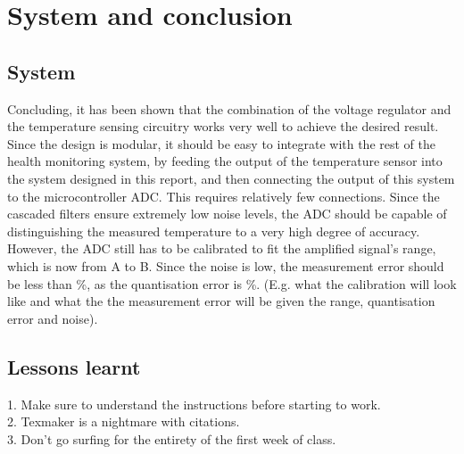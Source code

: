 \chapter{System and conclusion}
\vspace{-5mm}
\section{System}
Concluding, it has been shown that the combination of the voltage regulator and the temperature sensing circuitry works very well to achieve the desired result. Since the design is modular, it should be easy to integrate with the rest of the health monitoring system, by feeding the output of the temperature sensor into the system designed in this report, and then connecting the output of this system to the microcontroller ADC. This requires relatively few connections. Since the cascaded filters ensure extremely low noise levels, the ADC should be capable of distinguishing the measured temperature to a very high degree of accuracy. However, the ADC still has to be calibrated to fit the amplified signal's range, which is now from A to B. Since the noise is low, the measurement error should be less than \%, as the quantisation error is \%.
(E.g. what the calibration will look like and what the the measurement error will be given the range, quantisation error and noise). 

\section{Lessons learnt}
1. Make sure to understand the instructions before starting to work.\\
2. Texmaker is a nightmare with citations.\\
3. Don't go surfing for the entirety of the first week of class.

